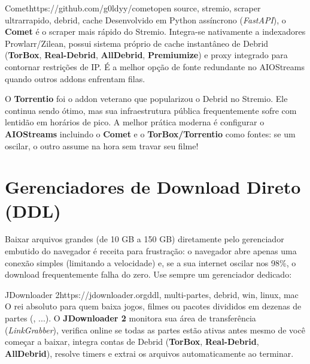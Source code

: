 \documentclass{pousadaguide}
\begin{document}
\begin{ferramenta}[recomendado,logo=comet]{Comet}{https://github.com/g0ldyy/comet}{open source, stremio, scraper ultrarrapido, debrid, cache}
Desenvolvido em Python assíncrono (\emph{FastAPI}), o \textbf{Comet} é o scraper mais rápido do Stremio. Integra-se nativamente a indexadores Prowlarr/Zilean, possui sistema próprio de cache instantâneo de Debrid (\textbf{TorBox}, \textbf{Real-Debrid}, \textbf{AllDebrid}, \textbf{Premiumize}) e proxy integrado para contornar restrições de IP. É a melhor opção de fonte redundante no AIOStreams quando outros addons enfrentam filas. 
\end{ferramenta}

\begin{dica}
O \textbf{Torrentio} foi o addon veterano que popularizou o Debrid no Stremio. Ele continua sendo ótimo, mas sua infraestrutura pública frequentemente sofre com lentidão em horários de pico. A melhor prática moderna é configurar o \textbf{AIOStreams} incluindo o \textbf{Comet} e o \textbf{TorBox/Torrentio} como fontes: se um oscilar, o outro assume na hora sem travar seu filme!
\end{dica}

\section{Gerenciadores de Download Direto (DDL)}

Baixar arquivos grandes (de 10 GB a 150 GB) diretamente pelo gerenciador embutido do navegador é receita para frustração: o navegador abre apenas uma conexão simples (limitando a velocidade) e, se a sua internet oscilar nos 98\%, o download frequentemente falha do zero. Use sempre um gerenciador dedicado:

\begin{ferramenta}[goat,logo=jdownloader2]{JDownloader 2}{https://jdownloader.org}{ddl, multi-partes, debrid, win, linux, mac}
O rei absoluto para quem baixa jogos, filmes ou pacotes divididos em dezenas de partes (, ...). O \textbf{JDownloader 2} monitora sua área de transferência (\emph{LinkGrabber}), verifica online se todas as partes estão ativas antes mesmo de você começar a baixar, integra contas de Debrid (\textbf{TorBox}, \textbf{Real-Debrid}, \textbf{AllDebrid}), resolve timers e extrai os arquivos automaticamente ao terminar. 
\end{ferramenta}
\end{document}
